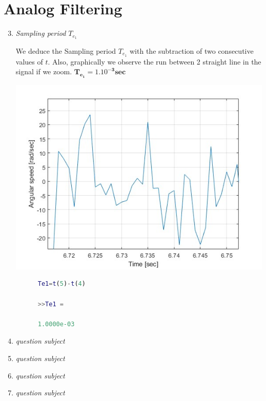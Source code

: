\documentclass[a4paper,12pt]{article}
\begin{document}
\section{Analog Filtering}
\begin{enumerate}[label={\color{blue}\arabic*)}]
  \setcounter{enumi}{2}
  \item \emph{Sampling period \(T_{e_1}\)}
  
  We deduce the Sampling period \(T_{e_1}\) with the subtraction of two consecutive values of \(t\). Also, graphically we observe the run between 2 straight line in the signal if we zoom. \(\mathbf{T_{e_1}=1.10^{-3} sec}\) 
  \begin{multicols}{2}
    \begin{center}
      \includegraphics[scale=0.3]{Figures/q3.jpg}
      \label{F2}
    \end{center}
    \columnbreak
    
    \begin{lstlisting}[style=Matlab-editor,language=Matlab, caption={Code for Figure 2}, captionpos=b, basicstyle=\small\ttfamily]
      %% Sampling period
      Te1=t(5)-t(4)

      >>Te1 =

      1.0000e-03
      \end{lstlisting}
    \end{multicols}
  \item \emph{question subject}
  \item \emph{question subject}
  
  \item \emph{question subject}
  \item \emph{question subject}
\end{enumerate}
\end{document}
